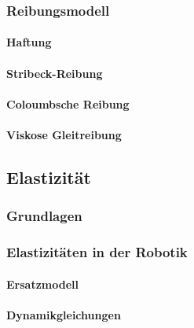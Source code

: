 \documentclass[a4paper, 11pt, accentcolor = tud3b]{tudreport}
\begin{document}
				\subsubsection{Reibungsmodell} %

					\paragraph{Haftung} %

					\paragraph{Stribeck-Reibung} %

					\paragraph{Coloumbsche Reibung} %

					\paragraph{Viskose Gleitreibung} %

			\subsection{Elastizität} %

				\subsubsection{Grundlagen} %

				\subsubsection{Elastizitäten in der Robotik} %

					\paragraph{Ersatzmodell} %

					\paragraph{Dynamikgleichungen} %
\end{document}
